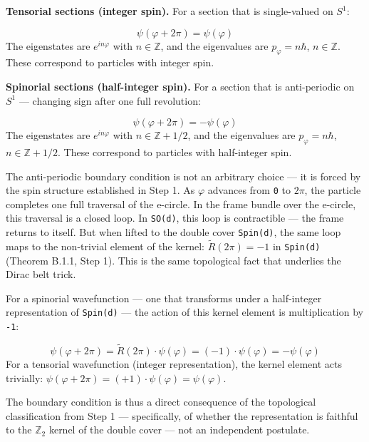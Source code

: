 \documentclass[aps,prd,preprint,superscriptaddress,longbibliography,floatfix]{revtex4-2}
\theoremstyle{remark}
\begin{document}
\textbf{Tensorial sections (integer spin).} For a section that is single-valued on $S^{1}$:


\begin{equation}
    \psi(\varphi + 2\pi) = \psi(\varphi)
\end{equation}
The eigenstates are $e^{in\varphi}$ with $n \in \mathbb{Z}$, and the eigenvalues are $p_\varphi = n\hbar$, $n \in \mathbb{Z}$. These correspond to particles with integer spin.

\textbf{Spinorial sections (half-integer spin).} For a section that is anti-periodic on $S^{1}$ --- changing sign after one full revolution:


\begin{equation}
    \psi(\varphi + 2\pi) = -\psi(\varphi)
\end{equation}
The eigenstates are $e^{in\varphi}$ with $n \in \mathbb{Z} + 1/2$, and the eigenvalues are $p_\varphi = n\hbar$, $n \in \mathbb{Z} + 1/2$. These correspond to particles with half-integer spin.

The anti-periodic boundary condition is not an arbitrary choice --- it is forced by the spin structure established in Step 1. As $\varphi$ advances from \texttt{0} to $2\pi$, the particle completes one full traversal of the e-circle. In the frame bundle over the e-circle, this traversal is a closed loop. In \texttt{SO(d)}, this loop is contractible --- the frame returns to itself. But when lifted to the double cover \texttt{Spin(d)}, the same loop maps to the non-trivial element of the kernel: $\tilde{R}(2\pi) = -1$ in \texttt{Spin(d)} (Theorem B.1.1, Step 1). This is the same topological fact that underlies the Dirac belt trick.

For a spinorial wavefunction --- one that transforms under a half-integer representation of \texttt{Spin(d)} --- the action of this kernel element is multiplication by \texttt{-1}:


\begin{equation}
    \psi(\varphi + 2\pi) = \tilde{R}(2\pi) \cdot \psi(\varphi) = (-1) \cdot \psi(\varphi) = -\psi(\varphi)
\end{equation}
For a tensorial wavefunction (integer representation), the kernel element acts trivially: $\psi(\varphi + 2\pi) = (+1) \cdot \psi(\varphi) = \psi(\varphi)$.

The boundary condition is thus a direct consequence of the topological classification from Step 1 --- specifically, of whether the representation is faithful to the $\mathbb{Z}_{2}$ kernel of the double cover --- not an independent postulate.
\end{document}
